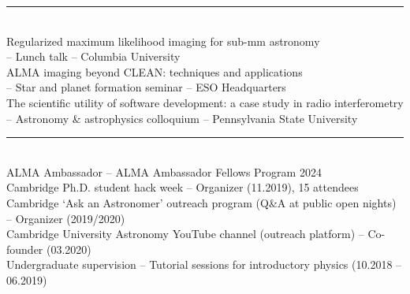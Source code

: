 \documentclass[10pt,preprint]{aastex}
\newcommand{\jj}[1]{\textcolor{red}{#1}}
\newcommand*{\xdash}[1][3em]{\rule[0.5ex]{#1}{0.7pt}}
\begin{document}
 \xdash[94ex] \\
\noindent Regularized maximum likelihood imaging for sub-mm astronomy \\
 -- Lunch talk -- Columbia University \\
\noindent ALMA imaging beyond CLEAN: techniques and applications \\
 -- Star and planet formation seminar -- ESO Headquarters \\
\noindent The scientific utility of software development: a case study in radio interferometry \\
 -- Astronomy \& astrophysics colloquium -- Pennsylvania State University

 \xdash[83ex] \\
\noindent ALMA Ambassador -- ALMA Ambassador Fellows Program 2024 \\
\noindent Cambridge Ph.D. student hack week -- Organizer (11.2019), 15 attendees \\
\noindent Cambridge \lq{}Ask an Astronomer\rq{} outreach program (Q\&A at public open nights) -- Organizer (2019/2020) \\
\noindent Cambridge University Astronomy %
YouTube channel (outreach platform) -- Co-founder (03.2020) \\
\noindent Undergraduate supervision -- Tutorial sessions for introductory physics (10.2018 -- 06.2019)
\end{document}
